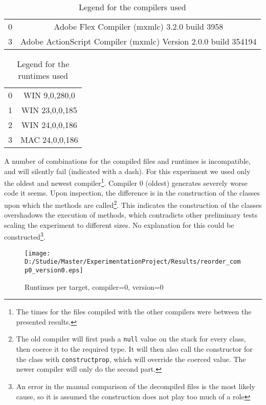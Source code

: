 \documentclass[a4paper,11pt]{scrartcl}
\begin{document}
\begin{table}[h!]
\begin{center}
\begin{tabular}{c|c}
0 & Adobe Flex Compiler (mxmlc) 3.2.0 build 3958 \\
3 & Adobe ActionScript Compiler (mxmlc) Version 2.0.0 build 354194 \\
\end{tabular}
\end{center}
\caption{Legend for the compilers used}
\label{tbl:reorder-compilers}
\end{table}

\begin{table}[h!]
\begin{center}
\begin{tabular}{c|c}
0 & WIN 9,0,280,0 \\
1 & WIN 23,0,0,185 \\
2 & WIN 24,0,0,186 \\
3 & MAC 24,0,0,186 \\
\end{tabular}
\end{center}
\caption{Legend for the runtimes used}
\label{tbl:reorder-runtimes}
\end{table}

A number of combinations for the compiled files and runtimes is incompatible, and will silently fail (indicated with a dash). For this experiment we used only the oldest and newest compiler\footnote{The times for the files compiled with the other compilers were between the presented results.}. Compiler 0 (oldest) generates severely worse code it seems. Upon inspection, the difference is in the construction of the classes upon which the methods are called\footnote{The old compiler will first push a \texttt{null} value on the stack for every class, then coerce it to the required type. It will then also call the constructor for the class  with \texttt{constructprop}, which will override the coerced value. The newer compiler will only do the second part.}. This indicates the construction of the classes overshadows the execution of methods, which contradicts other preliminary tests scaling the experiment to different sizes. No explanation for this could be constructed\footnote{An error in the manual comparison of the decompiled files is the most likely cause, so it is assumed the construction does not play too much of a role}.

\begin{figure}[h!]
\centering
\texttt{[image: D:/Studie/Master/ExperimentationProject/Results/reorder\_comp0\_version0.eps]}
\caption{Runtimes per target, compiler=0, version=0}
\label{fig:reorder-plot}
\end{figure}
\end{document}
